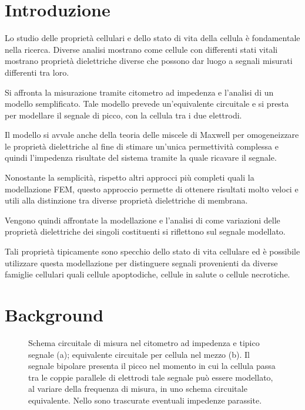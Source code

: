 \section{Introduzione}


Lo studio delle proprietà cellulari e dello stato di vita della cellula è fondamentale nella ricerca. Diverse analisi mostrano come cellule con differenti stati vitali mostrano proprietà dielettriche diverse che possono dar luogo a segnali misurati differenti tra loro.

Si affronta la misurazione tramite citometro ad impedenza e l'analisi di un modello semplificato. Tale modello prevede un'equivalente circuitale e si presta per modellare il segnale di picco, con la cellula tra i due elettrodi.

Il modello si avvale anche della teoria delle miscele di Maxwell per omogeneizzare le proprietà dielettriche al fine di stimare un'unica permettività complessa e quindi l'impedenza risultate del sistema tramite la quale ricavare il segnale.

Nonostante la semplicità, rispetto altri approcci più completi quali la modellazione FEM, questo approccio permette di ottenere risultati molto veloci e utili alla distinzione tra diverse proprietà dielettriche di membrana.

Vengono quindi affrontate la modellazione e l'analisi di come variazioni delle proprietà dielettriche dei singoli costituenti si riflettono sul segnale modellato.

Tali proprietà tipicamente sono specchio dello stato di vita cellulare ed è possibile utilizzare questa modellazione per distinguere segnali provenienti da diverse famiglie cellulari quali cellule apoptodiche, cellule in salute o cellule necrotiche.

\section{Background}

\begin{figure}[h!]
	\begin{subfigure}{0.5\linewidth}
			\centering
				\footnotesize{\def\svgwidth{0.95\linewidth}
				}
				\caption{}
	\end{subfigure}\hfill
	\begin{subfigure}{0.5\linewidth}
	\centering
	\footnotesize{\def\svgwidth{0.8\linewidth}
	}
	\caption{}
\end{subfigure}\hfill
	\caption{Schema circuitale di misura nel citometro ad impedenza e tipico segnale (a); equivalente circuitale per cellula nel mezzo (b). Il segnale bipolare presenta il picco nel momento in cui la cellula passa tra le coppie parallele di elettrodi tale segnale può essere modellato, al variare della frequenza di misura, in uno schema circuitale equivalente. Nello sono trascurate eventuali impedenze parassite.}
	\label{fig:modellocircuitale}
\end{figure}



